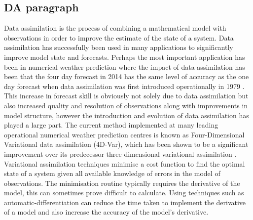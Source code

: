 \documentclass[11pt]{article}
\begin{document}
\subsection{DA paragraph}
Data assimilation is the process of combining a mathematical model with observations in order to improve the estimate of the state of a system. Data assimilation has successfully been used in many applications to significantly improve model state and forecasts. Perhaps the most important application has been in numerical weather prediction where the impact of data assimilation has been that the four day forecast in 2014 has the same level of accuracy as the one day forecast when data assimilation was first introduced operationally in 1979 \citep{rabier2005overview, kalnay2003atmospheric}. This increase in forecast skill is obviously not solely due to data assimilation but also increased quality and resolution of observations along with improvements in model structure, however the introduction and evolution of data assimilation has played a large part. The current method implemented at many leading operational numerical weather prediction centres is known as Four-Dimensional Variational data assimilation (4D-Var), which has been shown to be a significant improvement over its predecessor three-dimensional variational assimilation \citep{lorenc2005does}. Variational assimilation techniques minimise a cost function to find the optimal state of a system given all available knowledge of errors in the model of observations. The minimisation routine typically requires the derivative of the model, this can sometimes prove difficult to calculate. Using techniques such as automatic-differentiation can reduce the time taken to implement the derivative of a model and also increase the accuracy of the model's derivative.
\end{document}
